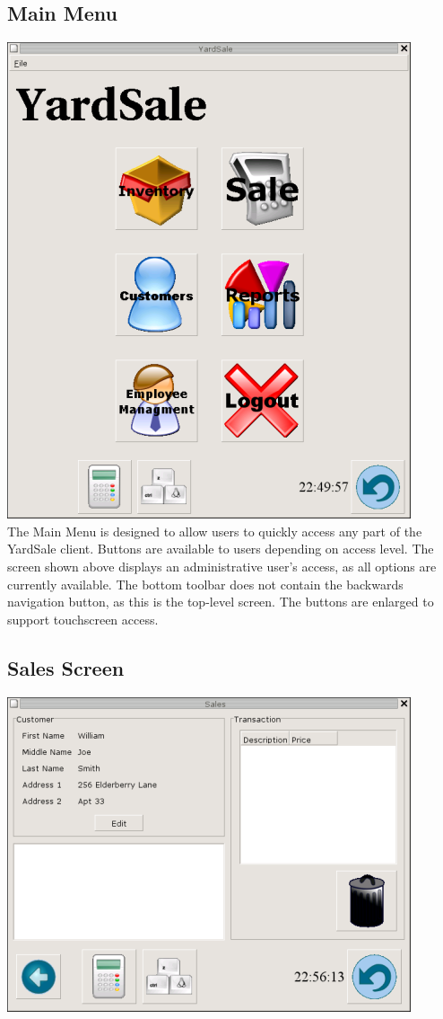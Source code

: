 \documentclass{report}
\begin{document}
\begin{itemize}
    \subsection{Main Menu}
    \includegraphics{ys_main_screener.png}\\

    The Main Menu is designed to allow users to quickly
    access any part of the YardSale client.  Buttons are available
    to users depending on access level.  The screen shown above
    displays an administrative user's access, as all options are
    currently available. The bottom toolbar does not contain the
    backwards navigation button, as this is the top-level screen.
    The buttons are enlarged to support touchscreen access.\\

    \subsection{Sales Screen}
    \includegraphics{ys_sales_screener.png}\\


\end{itemize}
\end{document}
